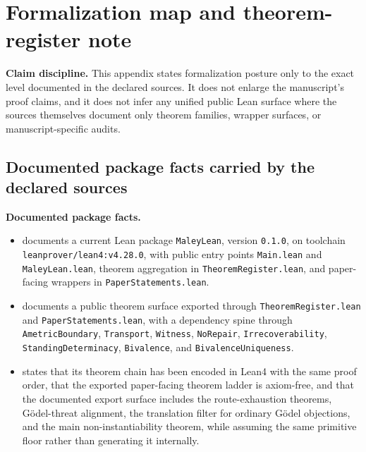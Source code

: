 \section{Formalization map and theorem-register note}
\label{app:formalization-map}

\begin{fixedbox}
\textbf{Claim discipline.} This appendix states formalization posture only to the exact level documented in the declared sources. It does not enlarge the manuscript's proof claims, and it does not infer any unified public Lean surface where the sources themselves document only theorem families, wrapper surfaces, or manuscript-specific audits.
\end{fixedbox}

\subsection*{Documented package facts carried by the declared sources}

\begin{fixedbox}
\textbf{Documented package facts.}
\begin{itemize}
  \item \fcas{} documents a current Lean package \texttt{MaleyLean}, version \texttt{0.1.0}, on toolchain \texttt{leanprover/lean4:v4.28.0}, with public entry points \texttt{Main.lean} and \texttt{MaleyLean.lean}, theorem aggregation in \texttt{TheoremRegister.lean}, and paper-facing wrappers in \texttt{PaperStatements.lean}.
  \item \trajpaper{} documents a public theorem surface exported through \texttt{TheoremRegister.lean} and \texttt{PaperStatements.lean}, with a dependency spine through \texttt{AmetricBoundary}, \texttt{Transport}, \texttt{Witness}, \texttt{NoRepair}, \texttt{Irrecoverability}, \texttt{StandingDeterminacy}, \texttt{Bivalence}, and \texttt{BivalenceUniqueness}.
  \item \noninstgodeldoc{} states that its theorem chain has been encoded in Lean4 with the same proof order, that the exported paper-facing theorem ladder is axiom-free, and that the documented export surface includes the route-exhaustion theorems, G\"odel-threat alignment, the translation filter for ordinary G\"odel objections, and the main non-instantiability theorem, while assuming the same primitive floor rather than generating it internally.
\end{itemize}
\end{fixedbox}

